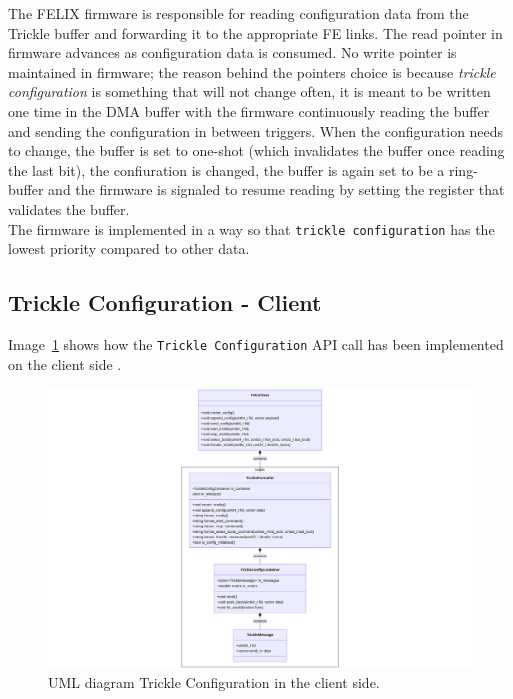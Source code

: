 The \acs{FELIX} firmware is responsible for reading configuration data from the Trickle buffer and forwarding it to the appropriate \acs{FE} links. The read pointer in firmware advances as configuration data is consumed. No write pointer is maintained in firmware; the reason behind the pointers choice is because \textit{trickle configuration} is something that will not change often, it is meant to be written one time in the \acs{DMA} buffer with the firmware continuously reading the buffer and sending the configuration in between triggers. When the configuration needs to change, the buffer is set to one-shot (which invalidates the buffer once reading the last bit), the confiuration is changed, the buffer is again set to be a ring-buffer and the firmware is signaled to resume reading by setting the register that validates the buffer.\\
The firmware is implemented in a way so that \texttt{trickle configuration} has the lowest priority compared to other data.

\subsection{Trickle Configuration - Client}

Image~\ref{fig:trickle-client-uml} shows how the \texttt{Trickle Configuration} \acs{API} call has been implemented on the client side \cite{felix-star-trickle-client}. 

\begin{figure}[htbp]
\centering
\includegraphics[width=1.3\textwidth]{images/contributions/client-trickle-config-uml.png}
\caption{UML diagram Trickle Configuration in the client side.}
\label{fig:trickle-client-uml}
\end{figure}

